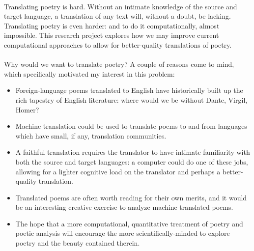 \paragraph{}{Translating poetry is hard. Without an intimate knowledge
  of the source and target language, a translation of any text will,
  without a doubt, be lacking. Translating poetry is even harder: and
  to do it computationally, almost impossible. This research project
  explores how we may improve current computational approaches to
  allow for better-quality translations of poetry.}
\paragraph{}{Why would we want to translate poetry? A couple of
  reasons come to mind, which specifically motivated my interest in
  this problem:}
\begin{itemize}
\item Foreign-language poems translated to English have historically
  built up the rich tapestry of English literature: where would we be
  without Dante, Virgil, Homer?
\item Machine translation could be used to translate poems to and from
  languages which have small, if any, translation communities.
\item A faithful translation requires the translator to have intimate
  familiarity with both the source and target languages: a computer
  could do one of these jobs, allowing for a lighter cognitive load on
  the translator and perhaps a better-quality translation.
\item Translated poems are often worth reading for their own merits,
  and it would be an interesting creative exercise to analyze machine
  translated poems.
\item The hope that a more computational, quantitative treatment of
  poetry and poetic analysis will encourage the more
  scientifically-minded to explore poetry and the beauty contained
  therein.
\end{itemize}
